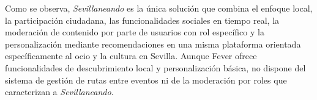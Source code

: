 \begin{table}[H]
\centering
\caption{Comparativa de soluciones existentes}
\label{tab:comparativa}
\end{table}

Como se observa, \textit{Sevillaneando} es la única solución que combina el enfoque local, la participación ciudadana, las funcionalidades sociales en tiempo real, la moderación de contenido por parte de usuarios con rol específico y la personalización mediante recomendaciones en una misma plataforma orientada específicamente al ocio y la cultura en Sevilla. Aunque Fever ofrece funcionalidades de descubrimiento local y personalización básica, no dispone del sistema de gestión de rutas entre eventos ni de la moderación por roles que caracterizan a \textit{Sevillaneando}.

